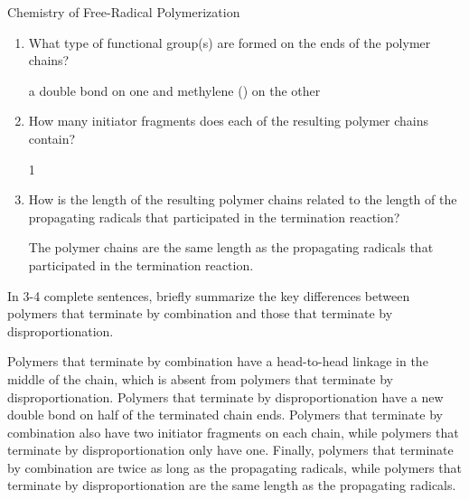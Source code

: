 \begin{activity}{Chemistry of Free-Radical Polymerization}
\begin{ctqs}
\begin{enumerate}
			\item What type of functional group(s) are formed on the ends of the polymer chains?
	
				\begin{solution}[0.5in]
					a double bond on one and methylene () on the other
				\end{solution}
			
			\item How many initiator fragments does each of the resulting polymer chains contain?
	
				\begin{solution}[0.5in]
					1
				\end{solution}
			
			\item How is the length of the resulting polymer chains related to the length of the propagating radicals that participated in the termination reaction?
	
				\begin{solution}[0.5in]
					The polymer chains are the same length as the propagating radicals that participated in the termination reaction.
				\end{solution}
				
		\end{enumerate}
	
	\question In 3-4 complete sentences, briefly summarize the key differences between polymers that terminate by combination and those that terminate by disproportionation.
	
				\begin{solution}[2.75in]
					Polymers that terminate by combination have a head-to-head linkage in the middle of the chain, which is absent from polymers that terminate by disproportionation.  Polymers that terminate by disproportionation have a new double bond on half of the terminated chain ends.  Polymers that terminate by combination also have two initiator fragments on each chain, while polymers that terminate by disproportionation only have one.  Finally, polymers that terminate by combination are twice as long as the propagating radicals, while polymers that terminate by disproportionation are the same length as the propagating radicals.
				\end{solution}
	

\end{ctqs}

		

\begin{model}
\label{\labelbase:mdl:FRPxferchem}


\end{model}
\end{activity}
